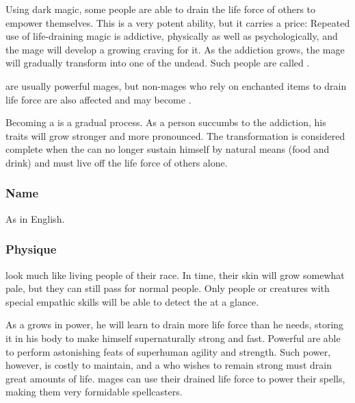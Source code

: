 


\subsectionn{\Reaver{}}
Using dark magic, some people are able to drain the life force of others to empower themselves. This is a very potent ability, but it carries a price: Repeated use of life-draining magic is addictive, physically as well as psychologically, and the mage will develop a growing craving for it. As the addiction grows, the mage will gradually transform into one of the undead. Such people are called \Reavers{}. 

\Reavers{} are usually powerful mages, but non-mages who rely on enchanted items to drain life force are also affected and may become \Reavers{}. 

Becoming a \Reaver{} is a gradual process. As a person succumbs to the addiction, his \Reaveric{} traits will grow stronger and more pronounced. The transformation is considered complete when the \Reaver{} can no longer sustain himself by natural means (food and drink) and must live off the life force of others alone. 


\subsubsection{Name}
As in English. 

\subsubsection{Physique}
\Reavers{} look much like living people of their race. In time, their skin will grow somewhat pale, but they can still pass for normal people. Only people or creatures with special empathic skills will be able to detect the \Reaver{} at a glance. 

As a \Reaver{} grows in power, he will learn to drain more life force than he needs, storing it in his body to make himself supernaturally strong and fast. Powerful \Reavers{} are able to perform astonishing feats of superhuman agility and strength. Such power, however, is costly to maintain, and a \Reaver{} who wishes to remain strong must drain great amounts of life. \Reaver{} mages can use their drained life force to power their spells, making them very formidable spellcasters. 

